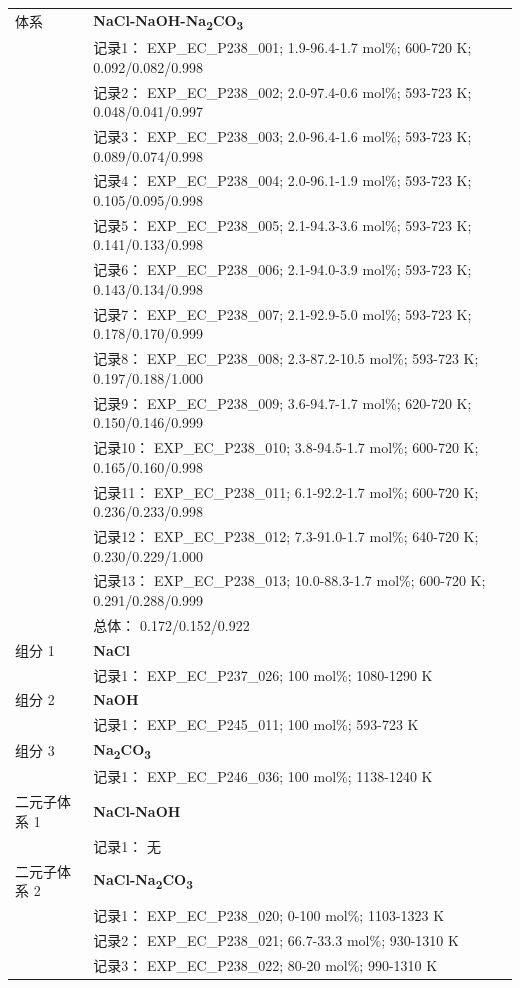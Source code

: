 \documentclass[12pt]{article}
\begin{document}
{\begin{longtable}[]{@{}
  >{\raggedright\arraybackslash}p{}
  >{\raggedright\arraybackslash}p{}@{}}
\midrule
体系 & \textbf{NaCl-NaOH-Na\textsubscript{2}CO\textsubscript{3}} \\
 & 记录1： EXP\_EC\_P238\_001; 1.9-96.4-1.7 mol\%; 600-720 K; 0.092/0.082/0.998 \\
 & 记录2： EXP\_EC\_P238\_002; 2.0-97.4-0.6 mol\%; 593-723 K; 0.048/0.041/0.997 \\
 & 记录3： EXP\_EC\_P238\_003; 2.0-96.4-1.6 mol\%; 593-723 K; 0.089/0.074/0.998 \\
 & 记录4： EXP\_EC\_P238\_004; 2.0-96.1-1.9 mol\%; 593-723 K; 0.105/0.095/0.998 \\
 & 记录5： EXP\_EC\_P238\_005; 2.1-94.3-3.6 mol\%; 593-723 K; 0.141/0.133/0.998 \\
 & 记录6： EXP\_EC\_P238\_006; 2.1-94.0-3.9 mol\%; 593-723 K; 0.143/0.134/0.998 \\
 & 记录7： EXP\_EC\_P238\_007; 2.1-92.9-5.0 mol\%; 593-723 K; 0.178/0.170/0.999 \\
 & 记录8： EXP\_EC\_P238\_008; 2.3-87.2-10.5 mol\%; 593-723 K; 0.197/0.188/1.000 \\
 & 记录9： EXP\_EC\_P238\_009; 3.6-94.7-1.7 mol\%; 620-720 K; 0.150/0.146/0.999 \\
 & 记录10： EXP\_EC\_P238\_010; 3.8-94.5-1.7 mol\%; 600-720 K; 0.165/0.160/0.998 \\
 & 记录11： EXP\_EC\_P238\_011; 6.1-92.2-1.7 mol\%; 600-720 K; 0.236/0.233/0.998 \\
 & 记录12： EXP\_EC\_P238\_012; 7.3-91.0-1.7 mol\%; 640-720 K; 0.230/0.229/1.000 \\
 & 记录13： EXP\_EC\_P238\_013; 10.0-88.3-1.7 mol\%; 600-720 K; 0.291/0.288/0.999 \\
 & 总体： 0.172/0.152/0.922  \\

组分 1  & \textbf{NaCl} \\
 & 记录1： EXP\_EC\_P237\_026; 100 mol\%; 1080-1290 K  \\

组分 2  & \textbf{NaOH} \\
 & 记录1： EXP\_EC\_P245\_011; 100 mol\%; 593-723 K  \\

组分 3  & \textbf{Na\textsubscript{2}CO\textsubscript{3}} \\
 & 记录1： EXP\_EC\_P246\_036; 100 mol\%; 1138-1240 K  \\

二元子体系 1 & \textbf{NaCl-NaOH} \\
 & 记录1： 无 \\
二元子体系 2  & \textbf{NaCl-Na\textsubscript{2}CO\textsubscript{3}} \\
 & 记录1： EXP\_EC\_P238\_020; 0-100 mol\%; 1103-1323 K \\
 & 记录2： EXP\_EC\_P238\_021; 66.7-33.3 mol\%; 930-1310 K \\
 & 记录3： EXP\_EC\_P238\_022; 80-20 mol\%; 990-1310 K  \\


\end{longtable}}
\end{document}
